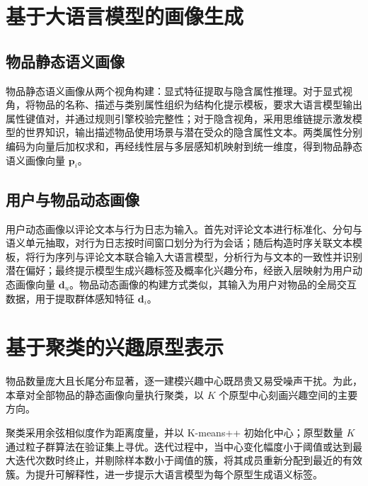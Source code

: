 \section{基于大语言模型的画像生成}
\label{sec:llm-profile}

\subsection{物品静态语义画像}
\label{subsec:static-profile}

物品静态语义画像从两个视角构建：显式特征提取与隐含属性推理。对于显式视角，将物品的名称、描述与类别属性组织为结构化提示模板，要求大语言模型输出属性键值对，并通过规则引擎校验完整性；对于隐含视角，采用思维链提示激发模型的世界知识，输出描述物品使用场景与潜在受众的隐含属性文本。两类属性分别编码为向量后加权求和，再经线性层与多层感知机映射到统一维度，得到物品静态语义画像向量 $\mathbf{p}_i$。


\subsection{用户与物品动态画像}
\label{subsec:dynamic-profile}

用户动态画像以评论文本与行为日志为输入。首先对评论文本进行标准化、分句与语义单元抽取，对行为日志按时间窗口划分为行为会话；随后构造时序关联文本模板，将行为序列与评论文本联合输入大语言模型，分析行为与文本的一致性并识别潜在偏好；最终提示模型生成兴趣标签及概率化兴趣分布，经嵌入层映射为用户动态画像向量 $\mathbf{d}_u$。物品动态画像的构建方式类似，其输入为用户对物品的全局交互数据，用于提取群体感知特征 $\mathbf{d}_i$。

\section{基于聚类的兴趣原型表示}
\label{sec:interest-prototype}

物品数量庞大且长尾分布显著，逐一建模兴趣中心既昂贵又易受噪声干扰。为此，本章对全部物品的静态画像向量执行聚类，以 $K$ 个原型中心刻画兴趣空间的主要方向。

聚类采用余弦相似度作为距离度量，并以 K-means++ 初始化中心；原型数量 $K$ 通过粒子群算法在验证集上寻优。迭代过程中，当中心变化幅度小于阈值或达到最大迭代次数时终止，并剔除样本数小于阈值的簇，将其成员重新分配到最近的有效簇。为提升可解释性，进一步提示大语言模型为每个原型生成语义标签。


